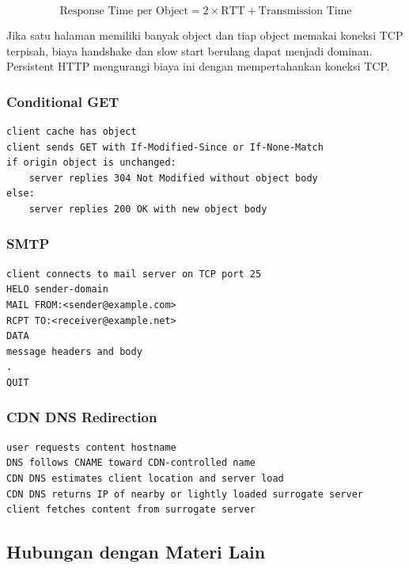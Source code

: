 \[
\text{Response Time per Object}=2\times \text{RTT}+\text{Transmission Time}
\]

Jika satu halaman memiliki banyak object dan tiap object memakai koneksi TCP terpisah, biaya handshake dan slow start berulang dapat menjadi dominan. Persistent HTTP mengurangi biaya ini dengan mempertahankan koneksi TCP.

\subsubsection*{Conditional GET}

\begin{lstlisting}[language={},caption={Conditional GET berbasis waktu dan ETag}]
client cache has object
client sends GET with If-Modified-Since or If-None-Match
if origin object is unchanged:
    server replies 304 Not Modified without object body
else:
    server replies 200 OK with new object body
\end{lstlisting}

\subsubsection*{SMTP}

\begin{lstlisting}[language={},caption={Urutan konseptual SMTP}]
client connects to mail server on TCP port 25
HELO sender-domain
MAIL FROM:<sender@example.com>
RCPT TO:<receiver@example.net>
DATA
message headers and body
.
QUIT
\end{lstlisting}

\subsubsection*{CDN DNS Redirection}

\begin{lstlisting}[language={},caption={Mekanisme CDN dengan DNS redirection}]
user requests content hostname
DNS follows CNAME toward CDN-controlled name
CDN DNS estimates client location and server load
CDN DNS returns IP of nearby or lightly loaded surrogate server
client fetches content from surrogate server
\end{lstlisting}

\subsection{Hubungan dengan Materi Lain}


